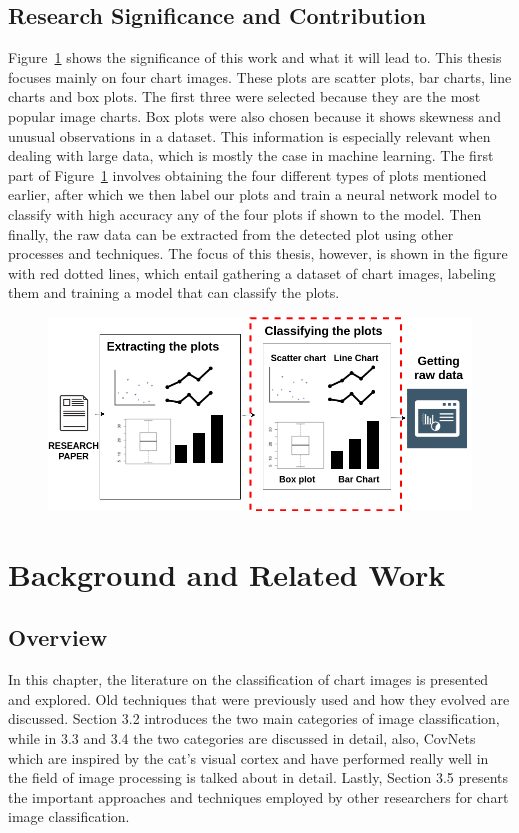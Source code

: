 \documentclass[12pt, a4paper,oneside]{report}
\begin{document}
\section{Research Significance and Contribution}
Figure~\ref{fig:vis} shows the significance of this work and what it will lead to. This thesis focuses mainly on four chart images. These plots are scatter plots, bar charts, line charts and box plots. The first three were selected because they are the most popular image charts. Box plots were also chosen because it shows skewness and unusual observations in a dataset. This information is especially relevant when dealing with large data, which is mostly the case in machine learning. The first part of Figure~\ref{fig:vis} involves obtaining the four different types of plots mentioned earlier, after which we then label our plots and train a neural network model to classify with high accuracy any of the four plots if shown to the model. Then finally, the raw data can be extracted from the detected plot using other processes and techniques. The focus of this thesis, however, is shown in the figure with red dotted lines, which entail gathering a dataset of chart images, labeling them and training a model that can classify the plots. 

\begin{figure}[!htb]

\label{fig:vis}
\includegraphics [scale=0.48] {vision}
\end{figure}


\chapter{Background and Related Work}
\section{Overview}
In this chapter, the literature on the classification of chart images is presented and explored. Old techniques that were previously used and how they evolved are discussed. Section 3.2 introduces the two main categories of image classification, while in 3.3 and 3.4 the two categories are discussed in detail, also, CovNets which are inspired by the cat’s visual cortex and have performed really well in the field of image processing is talked about in detail. Lastly, Section 3.5 presents the important approaches and techniques employed by other researchers for chart image classification.
\end{document}

